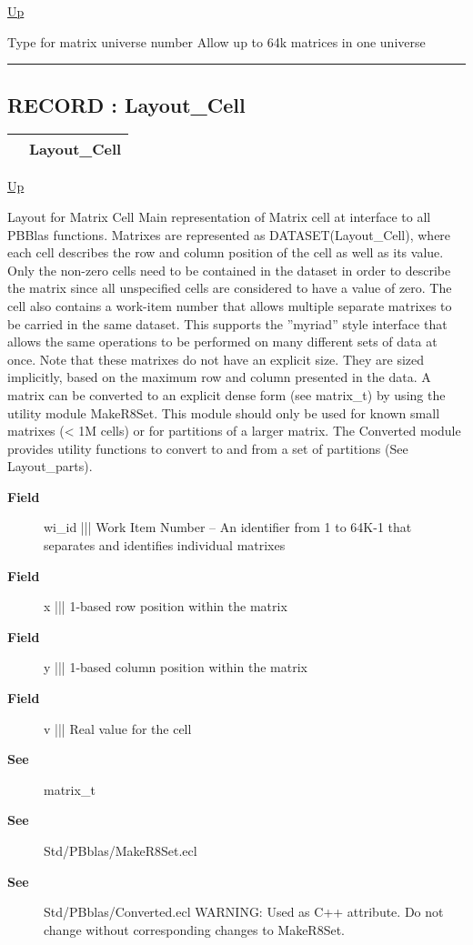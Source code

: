 \hyperlink{ecldoc:PBblas.Types}{Up}

\par
Type for matrix universe number Allow up to 64k matrices in one universe


\rule{\textwidth}{0.4pt}
\subsection*{RECORD : Layout\_Cell}
\hypertarget{ecldoc:pbblas.types.layout_cell}{}

{\renewcommand{\arraystretch}{1.5}
\begin{tabularx}{\textwidth}{|>{\raggedright\arraybackslash}l|X|}
\hline
\hspace{0pt} & Layout\_Cell \\
\hline
\end{tabularx}
}

\hyperlink{ecldoc:PBblas.Types}{Up}

\par
Layout for Matrix Cell Main representation of Matrix cell at interface to all PBBlas functions. Matrixes are represented as DATASET(Layout\_Cell), where each cell describes the row and column position of the cell as well as its value. Only the non-zero cells need to be contained in the dataset in order to describe the matrix since all unspecified cells are considered to have a value of zero. The cell also contains a work-item number that allows multiple separate matrixes to be carried in the same dataset. This supports the ''myriad'' style interface that allows the same operations to be performed on many different sets of data at once. Note that these matrixes do not have an explicit size. They are sized implicitly, based on the maximum row and column presented in the data. A matrix can be converted to an explicit dense form (see matrix\_t) by using the utility module MakeR8Set. This module should only be used for known small matrixes (< 1M cells) or for partitions of a larger matrix. The Converted module provides utility functions to convert to and from a set of partitions (See Layout\_parts).

\par
\begin{description}
\item [\textbf{Field}] wi\_id ||| Work Item Number -- An identifier from 1 to 64K-1 that separates and identifies individual matrixes
\item [\textbf{Field}] x ||| 1-based row position within the matrix
\item [\textbf{Field}] y ||| 1-based column position within the matrix
\item [\textbf{Field}] v ||| Real value for the cell
\item [\textbf{See}] matrix\_t
\item [\textbf{See}] Std/PBblas/MakeR8Set.ecl
\item [\textbf{See}] Std/PBblas/Converted.ecl WARNING: Used as C++ attribute. Do not change without corresponding changes to MakeR8Set.
\end{description}


